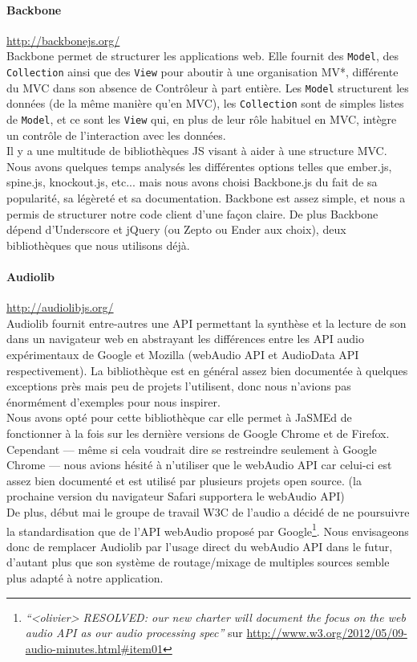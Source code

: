 \documentclass[12pt,a4paper]{article}
\begin{document}
\paragraph{Backbone}\url{http://backbonejs.org/}\\
Backbone permet de structurer les applications web. Elle fournit des \texttt{Model}, des \texttt{Collection} ainsi que des \texttt{View} pour aboutir à une organisation MV*, différente du MVC dans son absence de Contrôleur à part entière. Les \texttt{Model} structurent les données (de la même manière qu’en MVC), les \texttt{Collection} sont de simples listes de \texttt{Model}, et ce sont les \texttt{View} qui, en plus de leur rôle habituel en MVC, intègre un contrôle de l’interaction avec les données.\\
Il y a une multitude de bibliothèques JS visant à aider à une structure MVC. Nous avons quelques temps analysés les différentes options telles que ember.js, spine.js, knockout.js, etc... mais nous avons choisi Backbone.js du fait de sa popularité, sa légèreté et sa documentation. Backbone est assez simple, et nous a permis de structurer notre code client d’une façon claire. De plus Backbone dépend d’Underscore et jQuery (ou Zepto ou Ender aux choix), deux bibliothèques que nous utilisons déjà.

\paragraph{Audiolib}\url{http://audiolibjs.org/}\\
Audiolib fournit entre-autres une API permettant la synthèse et la lecture de son dans un navigateur web en abstrayant les différences entre les API audio expérimentaux de Google et Mozilla (webAudio API et AudioData API respectivement). La bibliothèque est en général assez bien documentée à quelques exceptions près mais peu de projets l’utilisent, donc nous n’avions pas énormément d’exemples pour nous inspirer.\\
Nous avons opté pour cette bibliothèque car elle permet à JaSMEd de fonctionner à la fois sur les dernière versions de Google Chrome et de Firefox. Cependant — même si cela voudrait dire se restreindre seulement à Google Chrome — nous avions hésité à n’utiliser que le webAudio API car celui-ci est assez bien documenté et est utilisé par plusieurs projets open source. (la prochaine version du navigateur Safari supportera le webAudio API)\\
De plus, début mai le groupe de travail W3C de l’audio a décidé de ne poursuivre la standardisation que de l’API webAudio proposé par Google\footnote{\emph{“<olivier> RESOLVED: our new charter will document the focus on the web audio API as our audio processing spec”} sur \url{http://www.w3.org/2012/05/09-audio-minutes.html#item01}}. Nous envisageons donc de remplacer Audiolib par l’usage direct du webAudio API dans le futur, d’autant plus que son système de routage/mixage de multiples sources semble plus adapté à notre application.
\end{document}
